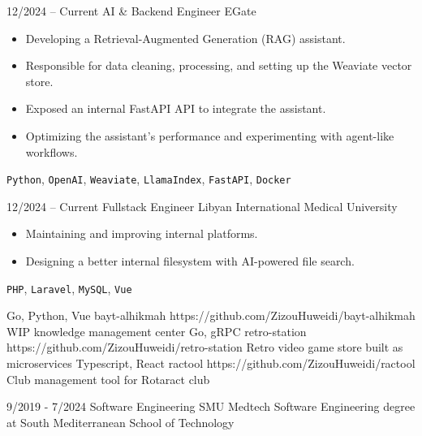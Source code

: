 \documentclass[9pt]{developercv} %
\begin{document}
\begin{entrylist}
    \entry
    {12/2024 -- Current}
    {AI \& Backend Engineer}
    {EGate}
    {\vspace{-10pt}
        \begin{itemize}[noitemsep,topsep=0pt,parsep=0pt,partopsep=0pt,leftmargin=-1pt]
            \item Developing a Retrieval-Augmented Generation (RAG) assistant.
            \item Responsible for data cleaning, processing, and setting up the Weaviate vector store.
            \item Exposed an internal FastAPI API to integrate the assistant.
            \item Optimizing the assistant's performance and experimenting with agent-like workflows.
        \end{itemize}
      \texttt{Python}, \texttt{OpenAI}, \texttt{Weaviate}, \texttt{LlamaIndex}, \texttt{FastAPI}, \texttt{Docker}}
        
    \entry
    {12/2024 -- Current}
    {Fullstack Engineer}
    {Libyan International Medical University}
    {\vspace{-10pt}
        \begin{itemize}[noitemsep,topsep=0pt,parsep=0pt,partopsep=0pt,leftmargin=-1pt]
            \item Maintaining and improving internal platforms.
            \item Designing a better internal filesystem with AI-powered file search.
        \end{itemize}
        \texttt{PHP}, \texttt{Laravel}, \texttt{MySQL}, \texttt{Vue}}
\end{entrylist}

\begin{entrylist}
	\entry
	{Go, Python, Vue}
	{bayt-alhikmah}
	{https://github.com/ZizouHuweidi/bayt-alhikmah}
	{WIP knowledge management center}
	\entry
	{Go, gRPC}
	{retro-station}
	{https://github.com/ZizouHuweidi/retro-station}
	{Retro video game store built as microservices}
	\entry
	{Typescript, React}
	{ractool}
	{https://github.com/ZizouHuweidi/ractool}
	{Club management tool for Rotaract club}
\end{entrylist}

\vspace{-10 pt}
\begin{entrylist}
	\entry
	{9/2019 - 7/2024}
	{Software Engineering}
	{SMU Medtech}
	{Software Engineering degree at South Mediterranean School of Technology}
\end{entrylist}
\end{document}
